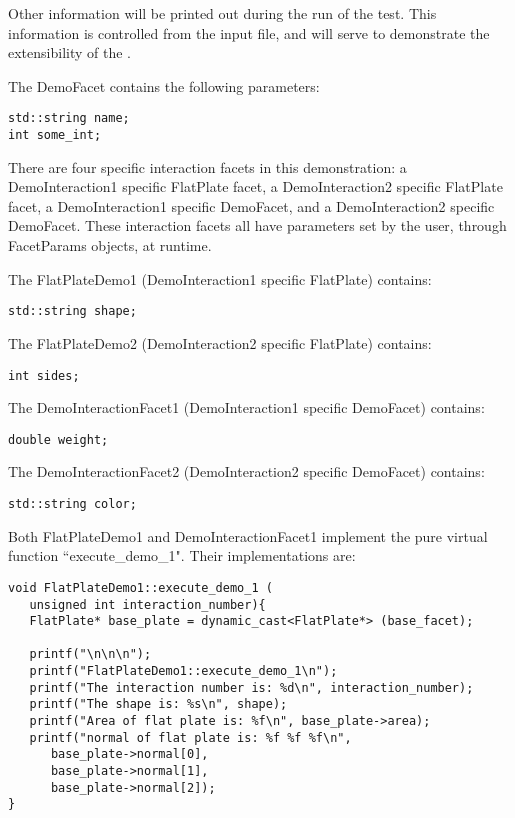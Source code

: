 \begin{description}
Other information will be printed out during the run of the test.
This information is controlled from the input file, and will serve
to demonstrate the extensibility of the \ModelDesc.

The DemoFacet contains the following parameters:

\begin{verbatim}
std::string name;
int some_int;
\end{verbatim}

There are four specific interaction facets in this demonstration:
a DemoInteraction1 specific FlatPlate facet, a DemoInteraction2
specific FlatPlate facet, a DemoInteraction1 specific DemoFacet, and
a DemoInteraction2 specific DemoFacet. These interaction facets
all have parameters set by the user, through FacetParams objects, at
runtime.

The FlatPlateDemo1 (DemoInteraction1 specific FlatPlate) contains:

\begin{verbatim}
std::string shape;
\end{verbatim}

The FlatPlateDemo2 (DemoInteraction2 specific FlatPlate) contains:

\begin{verbatim}
int sides;
\end{verbatim}

The DemoInteractionFacet1 (DemoInteraction1 specific DemoFacet) contains:

\begin{verbatim}
double weight;
\end{verbatim}

The DemoInteractionFacet2 (DemoInteraction2 specific DemoFacet) contains:

\begin{verbatim}
std::string color;
\end{verbatim}

Both FlatPlateDemo1 and DemoInteractionFacet1 implement the pure
virtual function ``execute\_demo\_1". Their implementations are:

\begin{verbatim}
void FlatPlateDemo1::execute_demo_1 (
   unsigned int interaction_number){
   FlatPlate* base_plate = dynamic_cast<FlatPlate*> (base_facet);

   printf("\n\n\n");
   printf("FlatPlateDemo1::execute_demo_1\n");
   printf("The interaction number is: %d\n", interaction_number);
   printf("The shape is: %s\n", shape);
   printf("Area of flat plate is: %f\n", base_plate->area);
   printf("normal of flat plate is: %f %f %f\n",
      base_plate->normal[0],
      base_plate->normal[1],
      base_plate->normal[2]);
}


\end{verbatim}
\end{description}
